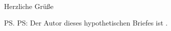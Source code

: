 \documentclass[12pt,ngerman,personal_settings,address_Hermann]{scrlttr2}
\begin{document}
\begin{letter}{\EmName\\ \EmAddress}
\Oliebe{\EmSex}{\EmVorname}



\closing{Herzliche Grüße}
\ps{PS: Der Autor dieses hypothetischen Briefes ist \AUTHOR.}
\vfill
\printURLlong
\printlicense
\end{letter}
\end{document}
